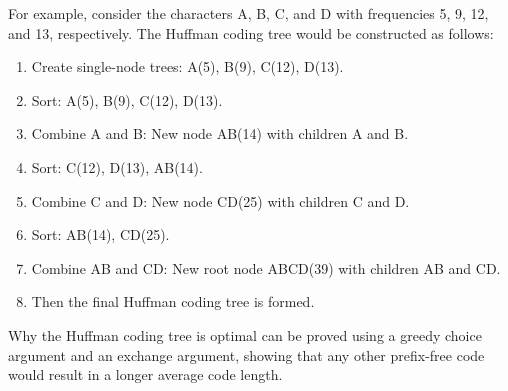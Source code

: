 For example, consider the characters A, B, C, and D with frequencies 5, 9, 12, and 13, respectively. The Huffman coding tree would be constructed as follows:
\begin{enumerate}
    \item Create single-node trees: A(5), B(9), C(12), D(13).
    \item Sort: A(5), B(9), C(12), D(13).
    \item Combine A and B: New node AB(14) with children A and B.
    \item Sort: C(12), D(13), AB(14).
    \item Combine C and D: New node CD(25) with children C and D.
    \item Sort: AB(14), CD(25).
    \item Combine AB and CD: New root node ABCD(39) with children AB and CD.
    \item Then the final Huffman coding tree is formed.
\end{enumerate}

Why the Huffman coding tree is optimal can be proved using a greedy choice argument and an exchange argument, showing that any other prefix-free code would result in a longer average code length.

